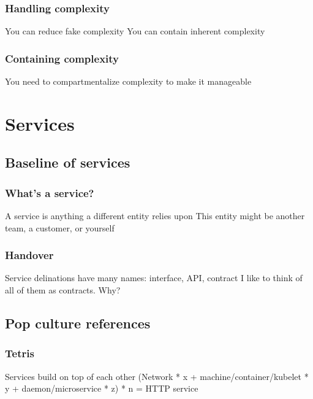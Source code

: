 \documentclass[t]{beamer}
\begin{document}
\begin{frame}
	\frametitle{Handling complexity}
	\begin{center}
		\vfill
		You can reduce fake complexity
		\vfill
		You can contain inherent complexity
		\vfill
	\end{center}
\end{frame}

\begin{frame}
	\frametitle{Containing complexity}
	\begin{center}
		\vfill
		You need to compartmentalize complexity to make it manageable
		\vfill
	\end{center}
\end{frame}



\section{Services}


\subsection{Baseline of services}

\begin{frame}
	\frametitle{What's a service?}
	\begin{center}
		\vfill
		A service is anything a different entity relies upon
		\vfill
		This entity might be another team, a customer, or yourself
		\vfill
	\end{center}
\end{frame}

\begin{frame}
	\frametitle{Handover}
	\begin{center}
		\vfill
		Service delinations have many names: interface, API, contract
		\vfill
		I like to think of all of them as contracts. Why?
		\vfill
	\end{center}
\end{frame}


\subsection{Pop culture references}

\begin{frame}
	\frametitle{Tetris}
	\begin{center}
		\vfill
		Services build on top of each other
		\vfill
		(Network * x + machine/container/kubelet * y + daemon/microservice * z) * n = HTTP service
		\vfill
	\end{center}
\end{frame}
\end{document}
